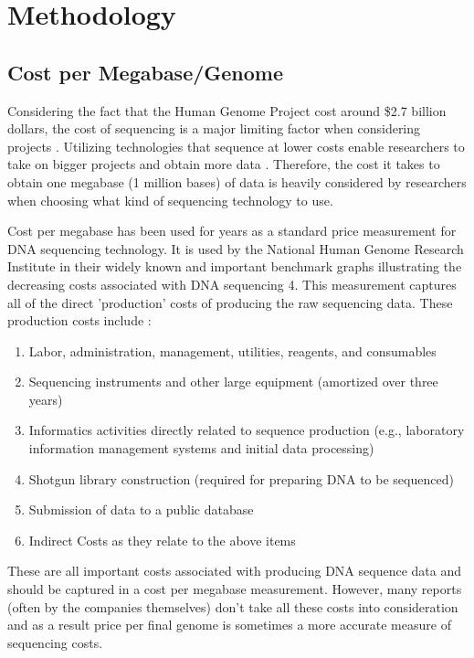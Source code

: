 \documentclass[12pt,letterpaper]{report}
\begin{document}
\section{Methodology}

\subsection{Cost per Megabase/Genome}

Considering the fact that the Human Genome Project cost around \$2.7 billion dollars, the cost of sequencing is a major limiting factor when considering projects \cite{Salto-Tellez}. Utilizing technologies that sequence at lower costs enable researchers to take on bigger projects and obtain more data \cite{Shendure}. Therefore, the cost it takes to obtain one megabase (1 million bases) of data is heavily considered by researchers when choosing what kind of sequencing technology to use.

Cost per megabase has been used for years as a standard price measurement for DNA sequencing technology. It is used by the National Human Genome Research Institute in their widely known and important benchmark graphs illustrating the decreasing costs associated with DNA sequencing 4. This measurement captures all of the direct 'production' costs of producing the raw sequencing data. These production costs include \cite{nhgriseqcosts}:

\begin{enumerate}
  \item Labor, administration, management, utilities, reagents, and consumables
  \item Sequencing instruments and other large equipment (amortized over three years)
  \item Informatics activities directly related to sequence production (e.g., laboratory information management systems and initial data processing)
  \item Shotgun library construction (required for preparing DNA to be sequenced)
  \item Submission of data to a public database
  \item Indirect Costs as they relate to the above items
\end{enumerate}

These are all important costs associated with producing DNA sequence data and should be captured in a cost per megabase measurement. However, many reports (often by the companies themselves) don't take all these costs into consideration and as a result price per final genome is sometimes a more accurate measure of sequencing costs.
\end{document}
